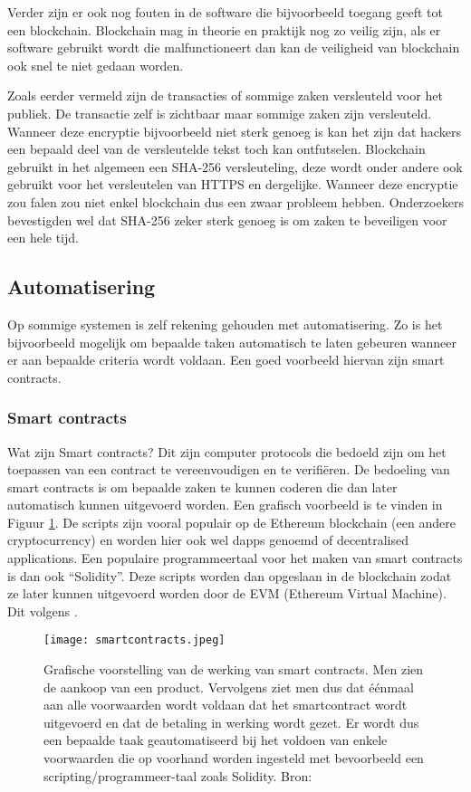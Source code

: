Verder zijn er ook nog fouten in de software die bijvoorbeeld toegang geeft tot een blockchain. Blockchain mag in theorie en praktijk nog zo veilig zijn, als er software gebruikt wordt die malfunctioneert dan kan de veiligheid van blockchain ook snel te niet gedaan worden.

Zoals eerder vermeld zijn de transacties of sommige zaken versleuteld voor het publiek. De transactie zelf is zichtbaar maar sommige zaken zijn versleuteld. Wanneer deze encryptie bijvoorbeeld niet sterk genoeg is kan het zijn dat hackers een bepaald deel van de versleutelde tekst toch kan ontfutselen. Blockchain gebruikt in het algemeen een SHA-256 versleuteling, deze wordt onder andere ook gebruikt voor het versleutelen van HTTPS en dergelijke. Wanneer deze encryptie zou falen zou niet enkel blockchain dus een zwaar probleem hebben. Onderzoekers bevestigden wel dat SHA-256 zeker sterk genoeg is om zaken te beveiligen voor een hele tijd.

\subsection{Automatisering}
Op sommige systemen is zelf rekening gehouden met automatisering. Zo is het bijvoorbeeld mogelijk om bepaalde taken automatisch te laten gebeuren wanneer er aan bepaalde criteria wordt voldaan. Een goed voorbeeld hiervan zijn smart contracts.

\subsubsection{Smart contracts}
Wat zijn Smart contracts? Dit zijn computer protocols die bedoeld zijn om het toepassen van een contract te vereenvoudigen en te verifiëren. De bedoeling van smart contracts is om bepaalde zaken te kunnen coderen die dan later automatisch kunnen uitgevoerd worden. Een grafisch voorbeeld is te vinden in Figuur \ref{fig:smartcontracts}. De scripts zijn vooral populair op de Ethereum blockchain (een andere cryptocurrency) en worden hier ook wel dapps genoemd of decentralised applications. Een populaire programmeertaal voor het maken van smart contracts is dan ook ``Solidity''. Deze scripts worden dan opgeslaan in de blockchain zodat ze later kunnen uitgevoerd worden door de EVM (Ethereum Virtual Machine). Dit volgens \textcite{Chandrayan2017}.

 \begin{figure}
	\texttt{[image: smartcontracts.jpeg]}
	\caption{Grafische voorstelling van de werking van smart contracts. Men zien de aankoop van een product. Vervolgens ziet men dus dat éénmaal aan alle voorwaarden wordt voldaan dat het smartcontract wordt uitgevoerd en dat de betaling in werking wordt gezet. Er wordt dus een bepaalde taak geautomatiseerd bij het voldoen van enkele voorwaarden die op voorhand worden ingesteld met bevoorbeeld een scripting/programmeer-taal zoals Solidity. Bron: \textcite{Itweb}}
	\label{fig:smartcontracts}
\end{figure}


